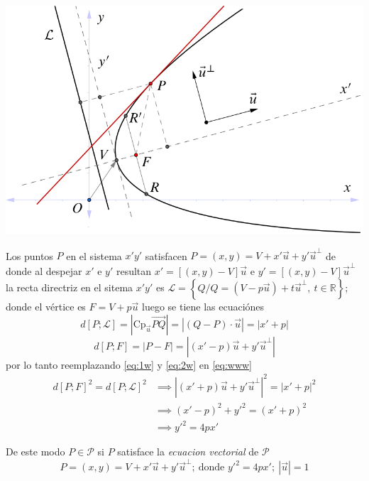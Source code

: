 \documentclass[12pt,]{report}
\let\origfigure=\figure
\let\endorigfigure=\endfigure
\renewenvironment{figure}[1][]{%
  \origfigure[H]
}{%
  \endorigfigure
}
\theoremstyle{slplain}
\begin{document}
\begin{figure}

{\centering \includegraphics{parabola} 

}

\caption{Elipse vectorial}\label{fig:hiperbola1}
\end{figure}

Los puntos \(P\) en el sistema \(x'y'\) satisfacen
\(P=(x,y)=V+x'\vec{u}+y'\vec{u}^\perp\) de donde al despejar \(x'\) e \(y'\) resultan \(x'=[(x,y)-V]\vec{u}\) e \(y'=[(x,y)-V]\vec{u}^\perp\)
la recta directriz en el sitema \(x'y'\) es
\(\mathcal{L}=\left\{Q/Q=(V-p\vec{u})+t\vec{u}^\perp,\:t\in \mathbb{R}\right\}\); donde el vértice es \(F=V+p\vec{u}\) luego se tiene las ecuaciónes
\begin{equation}
d[P;\mathcal{L}]=\left|\text{Cp}_{\vec{u}}\vec{PQ}\right|=\left|(Q-P)\cdot\vec{u}\right|=\left|x'+p\right|\label{eq:1w}
\end{equation}
\begin{equation}
d[P;F]=\left|P-F\right|=\left|(x'-p)\vec{u}+y'\vec{u}^{\perp}\right|\label{eq:2w}
\end{equation}
por lo tanto reemplazando \eqref{eq:1w} y \eqref{eq:2w} en \eqref{eq:www}
\begin{align*}
d\left[P;F\right]^2=d\left[P;\mathcal{L}\right]^2
& \implies \left|(x'+p)\vec{u}+y'\vec{u}^\perp\right|^2=\left|x'+p\right|^2 \\
&\implies (x'-p)^2+y'^2=(x'+p)^2\\
&\implies y'^2=4px'
\end{align*}

De este modo \(P\in\mathcal{P}\) si \(P\) satisface la \emph{ecuacion vectorial} de \(\mathcal{P}\) \[P=(x,y)=V+x'\vec{u}+y'\vec{u}^\perp;\: \text{donde } y'^2=4px'; \:\left|\vec{u}\right|=1\]
\end{document}
